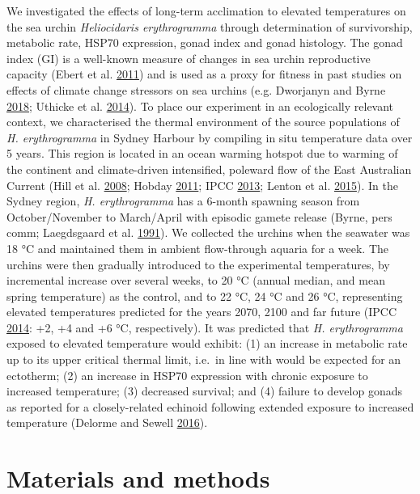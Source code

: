 \documentclass[a4paper,10pt, oneside]{memoir}
\begin{document}
We investigated the effects of long-term acclimation to elevated temperatures on the sea urchin \emph{Heliocidaris erythrogramma} through determination of survivorship, metabolic rate, HSP70 expression, gonad index and gonad histology.
The gonad index (GI) is a well-known measure of changes in sea urchin reproductive capacity (Ebert et al. \protect\hyperlink{ref-Ebert2011}{2011}) and is used as a proxy for fitness in past studies on effects of climate change stressors on sea urchins (e.g. Dworjanyn and Byrne \protect\hyperlink{ref-Dworjanyn2018}{2018}; Uthicke et al. \protect\hyperlink{ref-Uthicke2014}{2014}).
To place our experiment in an ecologically relevant context, we characterised the thermal environment of the source populations of \emph{H. erythrogramma} in Sydney Harbour by compiling in situ temperature data over 5 years.
This region is located in an ocean warming hotspot due to warming of the continent and climate-driven intensified, poleward flow of the East Australian Current (Hill et al. \protect\hyperlink{ref-Hill2008}{2008}; Hobday \protect\hyperlink{ref-Hobday2011}{2011}; IPCC \protect\hyperlink{ref-IPCC2013}{2013}; Lenton et al. \protect\hyperlink{ref-Lenton2015}{2015}).
In the Sydney region, \emph{H. erythrogramma} has a 6-month spawning season from October/November to March/April with episodic gamete release (Byrne, pers comm; Laegdsgaard et al. \protect\hyperlink{ref-Laegdsgaard1991}{1991}).
We collected the urchins when the seawater was 18 °C and maintained them in ambient flow-through aquaria for a week.
The urchins were then gradually introduced to the experimental temperatures, by incremental increase over several weeks, to 20 °C (annual median, and mean spring temperature) as the control, and to 22 °C, 24 °C and 26 °C, representing elevated temperatures predicted for the years 2070, 2100 and far future (IPCC \protect\hyperlink{ref-IPCC2014}{2014}: +2, +4 and +6 °C, respectively).
It was predicted that \emph{H. erythrogramma} exposed to elevated temperature would exhibit: (1) an increase in metabolic rate up to its upper critical thermal limit, i.e.~in line with would be expected for an ectotherm; (2) an increase in HSP70 expression with chronic exposure to increased temperature; (3) decreased survival; and (4) failure to develop gonads as reported for a closely-related echinoid following extended exposure to increased temperature (Delorme and Sewell \protect\hyperlink{ref-Delorme2016}{2016}).

\hypertarget{materials-and-methods}{%
\section{Materials and methods}\label{materials-and-methods}}
\end{document}
